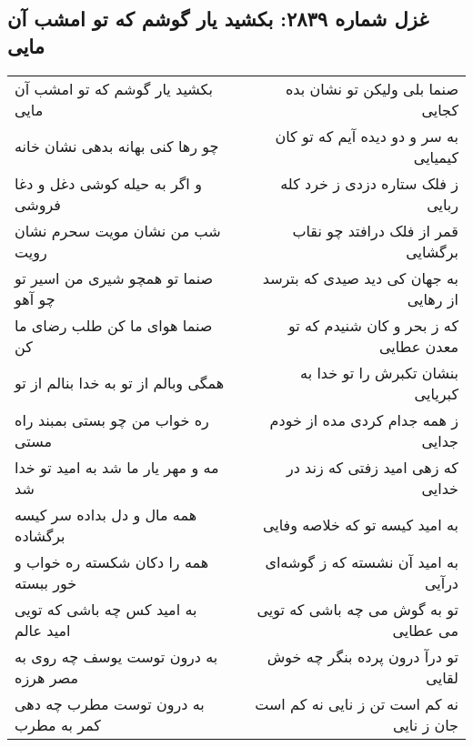 \begin{center}
\section*{غزل شماره ۲۸۳۹: بکشید یار گوشم که تو امشب آن مایی}
\label{sec:2839}
\begin{longtable}{l p{0.5cm} r}
بکشید یار گوشم که تو امشب آن مایی
&&
صنما بلی ولیکن تو نشان بده کجایی
\\
چو رها کنی بهانه بدهی نشان خانه
&&
به سر و دو دیده آیم که تو کان کیمیایی
\\
و اگر به حیله کوشی دغل و دغا فروشی
&&
ز فلک ستاره دزدی ز خرد کله ربایی
\\
شب من نشان مویت سحرم نشان رویت
&&
قمر از فلک درافتد چو نقاب برگشایی
\\
صنما تو همچو شیری من اسیر تو چو آهو
&&
به جهان کی دید صیدی که بترسد از رهایی
\\
صنما هوای ما کن طلب رضای ما کن
&&
که ز بحر و کان شنیدم که تو معدن عطایی
\\
همگی وبالم از تو به خدا بنالم از تو
&&
بنشان تکبرش را تو خدا به کبریایی
\\
ره خواب من چو بستی بمبند راه مستی
&&
ز همه جدام کردی مده از خودم جدایی
\\
مه و مهر یار ما شد به امید تو خدا شد
&&
که زهی امید زفتی که زند در خدایی
\\
همه مال و دل بداده سر کیسه برگشاده
&&
به امید کیسه تو که خلاصه وفایی
\\
همه را دکان شکسته ره خواب و خور ببسته
&&
به امید آن نشسته که ز گوشه‌ای درآیی
\\
به امید کس چه باشی که تویی امید عالم
&&
تو به گوش می چه باشی که تویی می عطایی
\\
به درون توست یوسف چه روی به مصر هرزه
&&
تو درآ درون پرده بنگر چه خوش لقایی
\\
به درون توست مطرب چه دهی کمر به مطرب
&&
نه کم است تن ز نایی نه کم است جان ز نایی
\\
\end{longtable}
\end{center}
